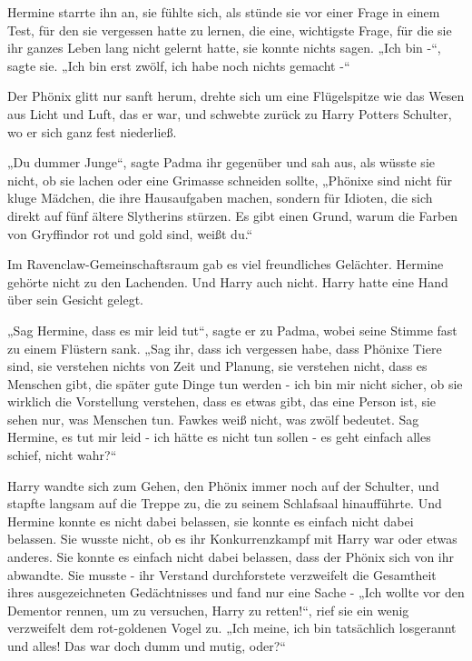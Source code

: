 {Hermine starrte ihn an, sie fühlte sich, als stünde sie vor einer Frage in einem Test, für den sie vergessen hatte zu lernen, die eine, wichtigste Frage, für die sie ihr ganzes Leben lang nicht gelernt hatte, sie konnte nichts sagen. „Ich bin -“, sagte sie. „Ich bin erst zwölf, ich habe noch nichts gemacht -“

Der Phönix glitt nur sanft herum, drehte sich um eine Flügelspitze wie das Wesen aus Licht und Luft, das er war, und schwebte zurück zu Harry Potters Schulter, wo er sich ganz fest niederließ.

„Du dummer Junge“, sagte Padma ihr gegenüber und sah aus, als wüsste sie nicht, ob sie lachen oder eine Grimasse schneiden sollte, „Phönixe sind nicht für kluge Mädchen, die ihre Hausaufgaben machen, sondern für Idioten, die sich direkt auf fünf ältere Slytherins stürzen. Es gibt einen Grund, warum die Farben von Gryffindor rot und gold sind, weißt du.“

Im Ravenclaw-Gemeinschaftsraum gab es viel freundliches Gelächter. Hermine gehörte nicht zu den Lachenden. Und Harry auch nicht. Harry hatte eine Hand über sein Gesicht gelegt.

„Sag Hermine, dass es mir leid tut“, sagte er zu Padma, wobei seine Stimme fast zu einem Flüstern sank. „Sag ihr, dass ich vergessen habe, dass Phönixe Tiere sind, sie verstehen nichts von Zeit und Planung, sie verstehen nicht, dass es Menschen gibt, die später gute Dinge tun werden - ich bin mir nicht sicher, ob sie wirklich die Vorstellung verstehen, dass es etwas gibt, das eine Person ist, sie sehen nur, was Menschen tun. Fawkes weiß nicht, was zwölf bedeutet. Sag Hermine, es tut mir leid - ich hätte es nicht tun sollen - es geht einfach alles schief, nicht wahr?“

Harry wandte sich zum Gehen, den Phönix immer noch auf der Schulter, und stapfte langsam auf die Treppe zu, die zu seinem Schlafsaal hinaufführte. Und Hermine konnte es nicht dabei belassen, sie konnte es einfach nicht dabei belassen. Sie wusste nicht, ob es ihr Konkurrenzkampf mit Harry war oder etwas anderes. Sie konnte es einfach nicht dabei belassen, dass der Phönix sich von ihr abwandte. Sie musste - ihr Verstand durchforstete verzweifelt die Gesamtheit ihres ausgezeichneten Gedächtnisses und fand nur eine Sache - „Ich wollte vor den Dementor rennen, um zu versuchen, Harry zu retten!“, rief sie ein wenig verzweifelt dem rot-goldenen Vogel zu. „Ich meine, ich bin tatsächlich losgerannt und alles! Das war doch dumm und mutig, oder?“

}
